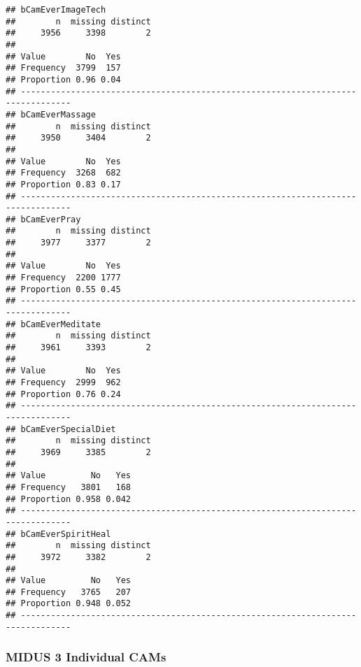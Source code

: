 \documentclass[
]{article}
\begin{document}
\begin{verbatim}
## bCamEverImageTech 
##        n  missing distinct 
##     3956     3398        2 
##                     
## Value        No  Yes
## Frequency  3799  157
## Proportion 0.96 0.04
## --------------------------------------------------------------------------------
## bCamEverMassage 
##        n  missing distinct 
##     3950     3404        2 
##                     
## Value        No  Yes
## Frequency  3268  682
## Proportion 0.83 0.17
## --------------------------------------------------------------------------------
## bCamEverPray 
##        n  missing distinct 
##     3977     3377        2 
##                     
## Value        No  Yes
## Frequency  2200 1777
## Proportion 0.55 0.45
## --------------------------------------------------------------------------------
## bCamEverMeditate 
##        n  missing distinct 
##     3961     3393        2 
##                     
## Value        No  Yes
## Frequency  2999  962
## Proportion 0.76 0.24
## --------------------------------------------------------------------------------
## bCamEverSpecialDiet 
##        n  missing distinct 
##     3969     3385        2 
##                       
## Value         No   Yes
## Frequency   3801   168
## Proportion 0.958 0.042
## --------------------------------------------------------------------------------
## bCamEverSpiritHeal 
##        n  missing distinct 
##     3972     3382        2 
##                       
## Value         No   Yes
## Frequency   3765   207
## Proportion 0.948 0.052
## --------------------------------------------------------------------------------
\end{verbatim}

\hypertarget{midus-3-individual-cams}{%
\subsubsection{MIDUS 3 Individual CAMs}\label{midus-3-individual-cams}}
\end{document}
